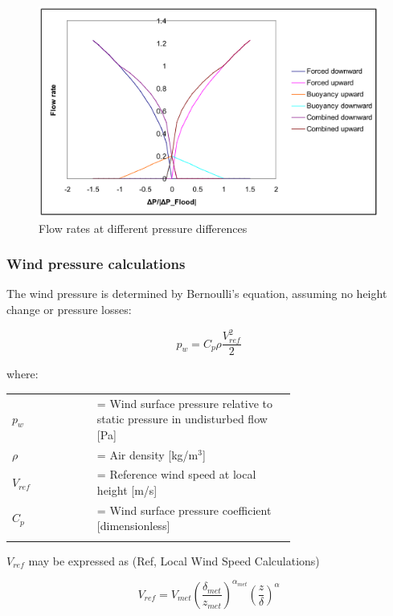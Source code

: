 \begin{figure}[hbtp] %
\centering
\includegraphics[width=0.9\linewidth, height=0.9\textheight, keepaspectratio=true]{media/image2743.svg.png}
\caption{Flow rates at different pressure differences \protect \label{fig:flow-rates-at-different-pressure-differences}}
\end{figure}

\subsubsection{Wind pressure calculations}\label{wind-pressure-calculations}

The wind pressure is determined by Bernoulli's equation, assuming no height change or pressure losses:

\begin{equation}
p_w = C_p \rho \frac{V_{ref}^2}{2}
\end{equation}

where:

\begin{tabular}{lp{0.7\linewidth}}
\\
$p_w$ &= Wind surface pressure relative to static pressure in undisturbed flow [Pa]\\
$\rho$ &= Air density [kg/m\(^{3}\)]\\
$V_{ref}$ &= Reference wind speed at local height [m/s]\\
$C_p$ &= Wind surface pressure coefficient [dimensionless]\\
\\
\end{tabular}

$V_{ref}$ may be expressed as (Ref, Local Wind Speed Calculations)

\begin{equation}
V_{ref} = V_{met} \left( \frac{\delta_{met}}{z_{met}} \right)^{\alpha_{met}}\left( \frac{z}{\delta} \right)^\alpha
\end{equation}


